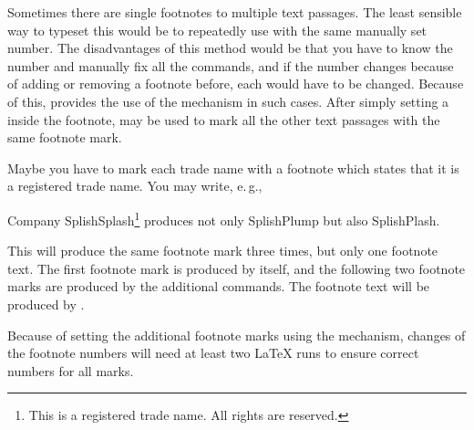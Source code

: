 \ifIgnoreThis %
\else %
\begin{Declaration}
\end{Declaration}
%
Sometimes there are single footnotes to
 multiple text passages. The least sensible way to typeset this would
be to repeatedly use  with the same manually set
number. The disadvantages of this method would be that you have to
know the number and manually fix all the 
commands, and if the number changes because of adding or removing a
footnote before, each  would have to be
changed. Because of this, \KOMAScript{} provides the use of the
 mechanism in
such cases. After simply setting a  inside the footnote,
 may be used to mark all the other text passages with
the same footnote mark.
\begin{Example}
  Maybe you have to mark each trade name with a footnote which states that it
  is a registered trade name. You may write, e.\,g.,
\begin{lstcode}
  Company SplishSplash\footnote{This is a registered trade name.
    All rights are reserved.\label{refnote}}
  produces not only SplishPlump
  but also SplishPlash.
\end{lstcode}
  This will produce the same footnote mark three times, but only one footnote
  text. The first footnote mark is produced by 
  itself, and the following two footnote marks are produced by
  the additional  commands. The footnote text will be produced by
  .  
\end{Example}
Because of setting the additional footnote marks using the 
mechanism, changes of the footnote numbers will need at least two \LaTeX{}
runs to ensure correct numbers for all  marks.%
%
%
\fi %


